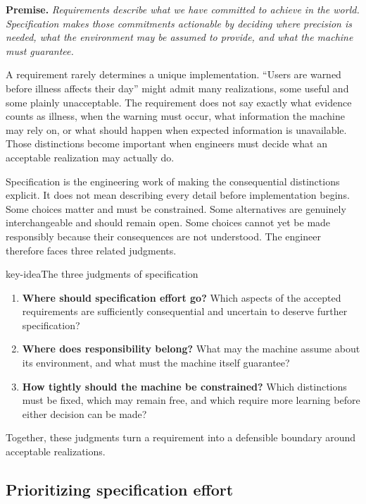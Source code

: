 \textbf{Premise.} \emph{Requirements describe what we have committed to achieve in the world. Specification
makes those commitments actionable by deciding where precision is needed, what the environment may
be assumed to provide, and what the machine must guarantee.}

A requirement rarely determines a unique implementation. ``Users are warned before illness affects
their day'' might admit many realizations, some useful and some plainly unacceptable. The
requirement does not say exactly what evidence counts as illness, when the warning must occur, what
information the machine may rely on, or what should happen when expected information is
unavailable. Those distinctions become important when engineers must decide what an acceptable
realization may actually do.

Specification is the engineering work of making the consequential distinctions explicit. It does
not mean describing every detail before implementation begins. Some choices matter and must be
constrained. Some alternatives are genuinely interchangeable and should remain open. Some choices
cannot yet be made responsibly because their consequences are not understood. The engineer
therefore faces three related judgments.

\begin{bookbox}{key-idea}{The three judgments of specification} %
\begin{enumerate}
\def\labelenumi{\arabic{enumi}.}
\tightlist
\item
  \textbf{Where should specification effort go?} Which aspects of the accepted requirements are
  sufficiently consequential and uncertain to deserve further specification?
\item
  \textbf{Where does responsibility belong?} What may the machine assume about its environment, and
  what must the machine itself guarantee?
\item
  \textbf{How tightly should the machine be constrained?} Which distinctions must be fixed, which may
  remain free, and which require more learning before either decision can be made?
\end{enumerate}
\end{bookbox}

Together, these judgments turn a requirement into a defensible boundary around acceptable
realizations.

\subsection{Prioritizing specification effort}\label{sec-prioritizing-effort}

